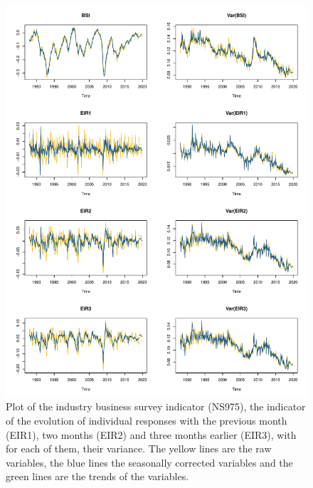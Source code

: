 \documentclass[12pt,a4paper,oneside]{book}
\begin{document}
 
\begin{figure}[htp!]
    \centering
    \includegraphics[scale=0.74]{Graphs/RJDemetra_plots.pdf}
    \caption{Plot of the industry business survey indicator (NS975), the indicator of the evolution of individual responses with the previous month (EIR1), two months (EIR2) and three months earlier (EIR3), with for each of them, their variance. The yellow lines are the raw variables, the blue lines the seasonally corrected variables and the green lines are the trends of the variables.}
    \label{fig:seasonal ajusted rjdemetra}
\end{figure}



\end{document}
